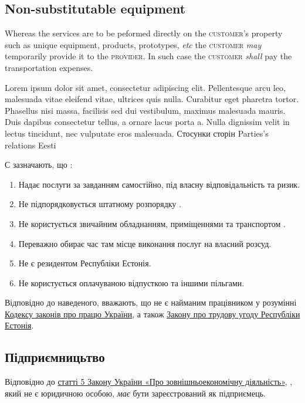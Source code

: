 \begin{Form}
\begin{paracol}{3}
{        \subsection{Non-substitutable equipment}
        Whereas the services are to be peformed directly on the \textsc{customer}'s property such as unique equipment, products, prototypes, \textit{etc} the \textsc{customer} \textit{may} temporarily provide it to the \textsc{provider}. In such case the \textsc{customer} \textit{shall} pay the transportation expenses.}
        {Lorem ipsum dolor sit amet, consectetur adipiscing elit. Pellentesque arcu leo, malesuada vitae eleifend vitae, ultrices quis nulla. Curabitur eget pharetra tortor. Phasellus nisi massa, facilisis sed dui vestibulum, maximus malesuada mauris. Duis dapibus consectetur tellus, a ornare lacus porta a. Nulla dignissim velit in lectus tincidunt, nec vulputate eros malesuada. }
      \clause
        {Стосунки сторін}
        {Parties's relations}
        {Eesti}
        {С зазначають, що :
        \begin{enumerate}
          \item Надає послуги за завданням самостійно, під власну відповідальність та ризик.
          \item Не підпорядковується штатному розпорядку .
          \item Не користується звичайним обладнанням, приміщеннями та транспортом .
          \item Переважно обирає час там місце виконання послуг на власний розсуд.
          \item Не є резидентом Республіки Естонія.
          \item Не користується оплачуваною відпусткою та іншими пільгами.
        \end{enumerate}

        Відповідно до наведеного,  вважають, що  не є найманим працівником  у розумінні \href{http://zakon2.rada.gov.ua/laws/show/322-08}{Кодексу законів про працю України}, а також \href{http://zakon24.ee/zakon-o-trudovom-dogovore/}{Закону про трудову угоду Республіки Естонія}.

        \subsection{Підприємницьтво}
        Відповідно до \href{http://zakon3.rada.gov.ua/laws/show/959-12/parao138\#o138}{статті 5 Закону України «Про зовнішньоекономічну діяльність»}, , який не є юридичною особою, \textit{має} бути зареєстрований як підприємець.

}
\end{paracol}
\end{Form}
